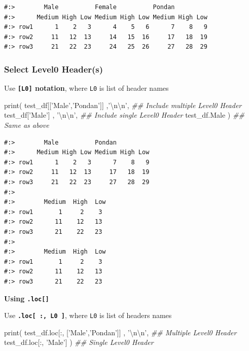 \documentclass[
]{book}
\newenvironment{Shaded}{\begin{snugshade}}{\end{snugshade}}
\newcommand{\BuiltInTok}[1]{#1}
\newcommand{\CharTok}[1]{\textcolor[rgb]{0.5,0.5,0.5}{#1}}
\newcommand{\CommentTok}[1]{\textcolor[rgb]{0.37,0.37,0.37}{\textit{#1}}}
\newcommand{\NormalTok}[1]{#1}
\newcommand{\StringTok}[1]{\textcolor[rgb]{0.5,0.5,0.5}{#1}}
\begin{document}
\begin{verbatim}
#:>        Male          Female          Pondan         
#:>      Medium High Low Medium High Low Medium High Low
#:> row1      1    2   3      4    5   6      7    8   9
#:> row2     11   12  13     14   15  16     17   18  19
#:> row3     21   22  23     24   25  26     27   28  29
\end{verbatim}

\hypertarget{select-level0-headers}{%
\subsubsection{Select Level0 Header(s)}\label{select-level0-headers}}

Use \textbf{\texttt{{[}L0{]}} notation}, where \texttt{L0} is list of header names

\begin{Shaded}
\begin{Highlighting}[]
\BuiltInTok{print}\NormalTok{( test_df[[}\StringTok{'Male'}\NormalTok{,}\StringTok{'Pondan'}\NormalTok{]] ,}\StringTok{'}\CharTok{\textbackslash{}n\textbackslash{}n}\StringTok{'}\NormalTok{,  }\CommentTok{## Include multiple Level0 Header}
\NormalTok{       test_df[}\StringTok{'Male'}\NormalTok{] ,          }\StringTok{'}\CharTok{\textbackslash{}n\textbackslash{}n}\StringTok{'}\NormalTok{,   }\CommentTok{## Include single Level0 Header}
\NormalTok{       test_df.Male )                       }\CommentTok{## Same as above}
\end{Highlighting}
\end{Shaded}

\begin{verbatim}
#:>        Male          Pondan         
#:>      Medium High Low Medium High Low
#:> row1      1    2   3      7    8   9
#:> row2     11   12  13     17   18  19
#:> row3     21   22  23     27   28  29 
#:> 
#:>        Medium  High  Low
#:> row1       1     2    3
#:> row2      11    12   13
#:> row3      21    22   23 
#:> 
#:>        Medium  High  Low
#:> row1       1     2    3
#:> row2      11    12   13
#:> row3      21    22   23
\end{verbatim}

\textbf{Using \texttt{.loc{[}{]}}}

Use \textbf{\texttt{.loc{[}\ :,\ L0\ {]}}}, where \texttt{L0} is list of headers names

\begin{Shaded}
\begin{Highlighting}[]
\BuiltInTok{print}\NormalTok{( test_df.loc[:, [}\StringTok{'Male'}\NormalTok{,}\StringTok{'Pondan'}\NormalTok{]] , }\StringTok{'}\CharTok{\textbackslash{}n\textbackslash{}n}\StringTok{'}\NormalTok{,  }\CommentTok{## Multiple Level0 Header}
\NormalTok{       test_df.loc[:, }\StringTok{'Male'}\NormalTok{] )                     }\CommentTok{## Single Level0 Header}
\end{Highlighting}
\end{Shaded}
\end{document}
